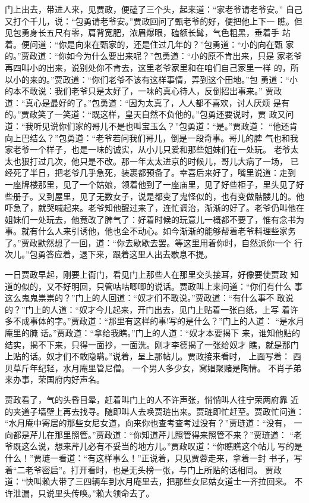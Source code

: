 门上出去，带进人来，见贾政，便磕了三个头，起来道：“家老爷请老爷安。”
自己又打个千儿，说：“包勇请老爷安。”贾政回问了甄老爷的好，便把他上下一
瞧。但见包勇身长五尺有零，肩背宽肥，浓眉爆眼，磕额长髯，气色粗黑，垂着手
站着。便问道：“你是向来在甄家的，还是住过几年的？”包勇道：“小的向在甄
家的。”贾政道：“你如今为什么要出来呢？”包勇道：“小的原不肯出来，只是
家老爷再四叫小的出来，说别处你不肯去，这里老爷家里和在咱们自己家里一样
的，所以小的来的。”贾政道：“你们老爷不该有这样事情，弄到这个田地。”包
勇道：“小的本不敢说：我们老爷只是太好了，一味的真心待人，反倒招出事来。”
贾政道：“真心是最好的了。”包勇道：“因为太真了，人人都不喜欢，讨人厌烦
是有的。”贾政笑了一笑道：“既这样，皇天自然不负他的。”包勇还要说时，贾
政又问道：“我听见说你们家的哥儿不是也叫宝玉么？”包勇道：“是。”贾政道：
“他还肯向上巴结么？”包勇道：“老爷若问我们哥儿，倒是一段奇事。哥儿的脾
气也和我家老爷一个样子，也是一味的诚实，从小儿只爱和那些姐妹们在一处玩。
老爷太太也狠打过几次，他只是不改。那一年太太进京的时候儿，哥儿大病了一场，
已经死了半日，把老爷几乎急死，装裹都预备了。幸喜后来好了，嘴里说道：走到
一座牌楼那里，见了一个姑娘，领着他到了一座庙里，见了好些柜子，里头见了好
些册子。又到屋里，见了无数女子，说是都变了鬼怪似的，也有变做骷髅儿的。他
吓急了，就哭喊起来。老爷知他醒过来了，连忙调治，渐渐的好了。老爷仍叫他在
姐妹们一处玩去，他竟改了脾气了：好着时候的玩意儿一概都不要了，惟有念书为
事。就有什么人来引诱他，他也全不动心。如今渐渐的能够帮着老爷料理些家务
了。”贾政默然想了一回，道：“你去歇歇去罢。等这里用着你时，自然派你一个
行次儿。”包勇答应着，退下来，跟着这里人出去歇息不提。

一日贾政早起，刚要上衙门，看见门上那些人在那里交头接耳，好像要使贾政
知道的似的，又不好明回，只管咕咕唧唧的说话。贾政叫上来问道：“你们有什么
事这么鬼鬼祟祟的？”门上的人回道：“奴才们不敢说。”贾政道：“有什么事不
敢说的？”门上的人道：“奴才今儿起来，开门出去，见门上贴着一张白纸，上写
着许多不成事体的字。”贾政道：“那里有这样的事!写的是什么？”门上的人道：
“是水月庵里的腌话。”贾政道：“拿给我瞧。”门上的人道：“奴才本要揭下
来，谁知他贴的结实，揭不下来，只得一面抄，一面洗。刚才李德揭了一张给奴才
瞧，就是那门上贴的话。奴才们不敢隐瞒。”说着，呈上那帖儿。贾政接来看时，
上面写着：
西贝草斤年纪轻，水月庵里管尼僧。
一个男人多少女，窝娼聚赌是陶情。
不肖子弟来办事，荣国府内好声名。

贾政看了，气的头昏目晕，赶着叫门上的人不许声张，悄悄叫人往宁荣两府靠
近的夹道子墙壁上再去找寻。随即叫人去唤贾琏出来。贾琏即忙赶至。贾政忙问道：
“水月庵中寄居的那些女尼女道，向来你也查考查考过没有？”贾琏道：“没有，
一向都是芹儿在那里照管。”贾政道：“你知道芹儿照管得来照管不来？”贾琏道：
“老爷既这么说，想来芹儿必有不妥当的地方儿。”贾政叹道：“你瞧瞧这个帖儿
写的是什么！”贾琏一看道：“有这样事么！”正说着，只见贾蓉走来，拿着一封
书子，写着“二老爷密启”。打开看时，也是无头榜一张，与门上所贴的话相同。
贾政道：“快叫赖大带了三四辆车到水月庵里去，把那些女尼姑女道士一齐拉回来。
不许泄漏，只说里头传唤。”赖大领命去了。

